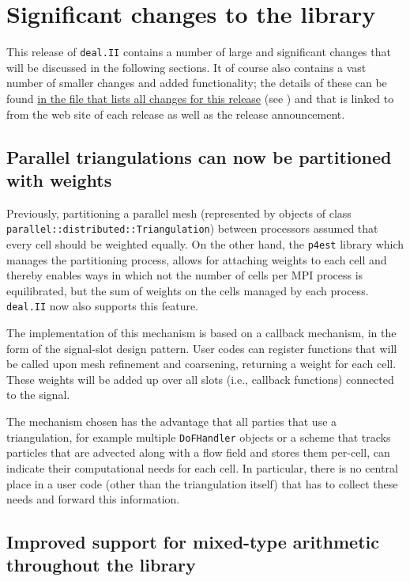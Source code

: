 \documentclass{ansarticle-preprint}
\newcommand{\specialword}[1]{\texttt{#1}}
\newcommand{\dealii}{{\specialword{deal.II}}}
\newcommand{\pfrst}{{\specialword{p4est}}}
\begin{document}
\section{Significant changes to the library}

This release of \dealii{} contains a number of large and significant changes
that will be discussed in the following sections. It of course also contains a
vast number of smaller changes and added functionality; the details of these
can be found
\href{https://www.dealii.org/8.4.0/doxygen/deal.II/changes_between_8_3_and_8_4.html}{in the file that lists all changes for this release} (see \cite{changes84})
and that is linked to from the web site of each release as well as the
release announcement.


\subsection{Parallel triangulations can now be partitioned with weights}

Previously, partitioning a parallel mesh (represented by objects of class
\texttt{parallel::}\-\texttt{distributed::}\-\texttt{Triangulation}) between
processors assumed that every cell should be weighted equally. On the
other hand, the \pfrst{} library which manages the partitioning
process, allows for attaching weights to each cell and thereby
enables ways in which not the number of cells per MPI process is
equilibrated, but the sum of weights on the cells managed by each
process. \dealii{} now also supports this feature.

The implementation of this mechanism is based on a callback mechanism,
in the form of the signal-slot design pattern. User codes can register
functions that will be called upon mesh refinement and coarsening,
returning a weight for each cell. These weights will be added up over
all slots (i.e., callback functions) connected to the signal.

The mechanism chosen has the advantage that all parties that use a
triangulation, for example multiple \texttt{DoFHandler} objects or a
scheme that tracks particles that are advected along with a flow field
and stores them per-cell, can indicate their computational needs for
each cell. In particular, there is no central place in a user code (other than
the 
triangulation itself) that has to collect these needs and forward this
information.


\subsection{Improved support for mixed-type arithmetic throughout the
  library}
\end{document}
